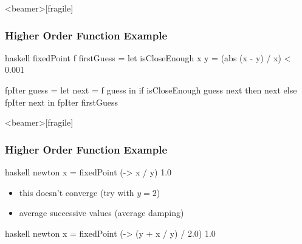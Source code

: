 \documentclass[dvipsnames]{beamer}
\theoremstyle{plain}
\begin{document}
\begin{frame}<beamer>[fragile]
  \frametitle{Higher Order Function Example}

  \begin{example}
    \begin{pygments}{haskell}
fixedPoint f firstGuess =
    let
        isCloseEnough x y = (abs (x - y) / x) < 0.001

        fpIter guess =
            let
                next = f guess
            in
                if isCloseEnough guess next
                then next
                else fpIter next
    in
        fpIter firstGuess
    \end{pygments}
  \end{example}
\end{frame}

\begin{frame}<beamer>[fragile]
  \frametitle{Higher Order Function Example}

  \begin{example}
    \begin{pygments}{haskell}
newton x = fixedPoint (\y -> x / y) 1.0
    \end{pygments}

    \pause
    \begin{itemize}
      \item this doesn't converge (try with $y = 2$)
      \item average successive values (average damping)
    \end{itemize}
    \begin{pygments}{haskell}
newton x = fixedPoint (\y -> (y + x / y) / 2.0) 1.0
    \end{pygments}
  \end{example}
\end{frame}
\end{document}
